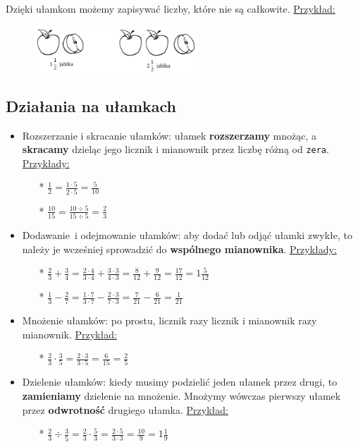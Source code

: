 \documentclass[12pt, a4paper]{article}
\begin{document}
\newline Dzięki ułamkom możemy zapisywać liczby, które nie są całkowite.
\underline{Przykład:}
\begin{figure}[htbp]
	\centering
		\includegraphics[width=0.55\textwidth]{jablka1.png}
	\label{fig:jablka1}
\end{figure}\cite{matemaks} 
\subsection{Działania na ułamkach}
\begin{itemize}
	\item Rozszerzanie i skracanie ułamków: ułamek \textbf{rozszerzamy} mnożąc, a \textbf{skracamy} dzieląc jego licznik i mianownik przez liczbę różną od \texttt{zera}.
	\newline\underline{Przykłady:} 
	\begin{itemize}
	\item[*]$\frac{1}{2}=\frac{1\cdot5}{2\cdot5}=\frac{5}{10}$
	\item[*]$\frac{10}{15}=\frac{10\div5}{15\div5}=\frac{2}{3}$
	\end{itemize}
	\item Dodawanie~i odejmowanie ułamków: aby dodać lub odjąć ułamki zwykłe, to należy je wcześniej sprowadzić do \textbf{wspólnego mianownika}.
	\newline\underline{Przykłady:} 
		\begin{itemize}
	\item[*]$\frac{2}{3}+\frac{3}{4}=\frac{2\cdot4}{3\cdot4}+\frac{3\cdot3}{4\cdot3}=\frac{8}{12}+\frac{9}{12}=\frac{17}{12}=1\frac{5}{12}$
	\item[*]$\frac{1}{3}-\frac{2}{7}=\frac{1\cdot7}{3\cdot7}-\frac{2\cdot3}{7\cdot3}=\frac{7}{21}-\frac{6}{21}=\frac{1}{21}$
		\end{itemize}
	\item Mnożenie ułamków: po prostu, licznik razy licznik i mianownik razy mianownik.
	\newline\underline{Przykład:} 
		\begin{itemize}
		\item[*]$\frac{2}{3}\cdot\frac{3}{5}=\frac{2\cdot3}{3\cdot5}=\frac{6}{15}=\frac{2}{5}$
		\end{itemize}
	\newpage
	\item Dzielenie ułamków: kiedy musimy podzielić jeden ułamek przez drugi, to \textbf{zamieniamy} dzielenie na mnożenie. Mnożymy wówczas pierwszy ułamek przez \textbf{odwrotność} drugiego ułamka.
	\newline\underline{Przykład:} 
		\begin{itemize}
		\item[*]$\frac{2}{3}\div\frac{3}{5}=\frac{2}{3}\cdot\frac{5}{3}=\frac{2\cdot5}{3\cdot3}=\frac{10}{9}=1\frac{1}{9}$
		\end{itemize}
\end{itemize}\cite{matemaks} 
\end{document}
